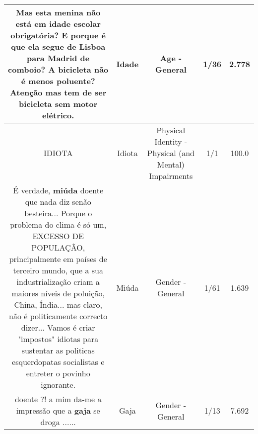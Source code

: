 \documentclass[11pt]{article}
\newlength\mylength
\begin{document}
\begin{center}
\begin{longtable}{|C{.65\mylength}|C{.30\mylength}|C{.12\mylength}|C{.12\mylength}|C{.12\mylength}|}
  \small Mas esta menina não está em \textbf{idade} escolar obrigatória? E porque é que ela segue de Lisboa para Madrid de comboio? A bicicleta não é menos poluente? Atenção mas tem de ser bicicleta sem motor elétrico.\normalsize   & Idade & Age - General & 1/36 & 2.778 \\  \hline
  \small IDIOTA\normalsize   & Idiota & Physical Identity - Physical (and Mental) Impairments & 1/1 & 100.0 \\  \hline
  \small É verdade, \textbf{miúda} doente que nada diz senão besteira... Porque o problema do clima é só um, EXCESSO DE POPULAÇÃO, principalmente em países de terceiro mundo, que a sua industrialização criam a maiores níveis de poluição, China, Índia... mas claro, não é politicamente correcto dizer... Vamos é criar "impostos" idiotas para sustentar as politicas esquerdopatas socialistas e entreter o povinho ignorante.\normalsize   & Miúda & Gender - General & 1/61 & 1.639 \\  \hline
  \small doente ?!  a mim da-me a impressão que a \textbf{gaja} se droga  ......\normalsize   & Gaja & Gender - General & 1/13 & 7.692 \\  \hline
  
\end{longtable}
\end{center}
\end{document}
